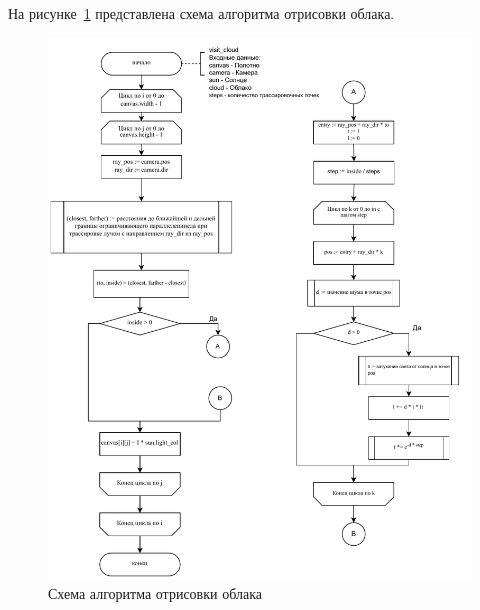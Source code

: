 На рисунке~\ref{fig:cloud_fc} представлена схема алгоритма отрисовки облака.
\begin{figure}[ht!]
	\centering
	\includegraphics[width=1.0\textwidth, page=1]{assets/img/cloud_flowchart.pdf}   
	\caption{Схема алгоритма отрисовки облака}
	\label{fig:cloud_fc}
\end{figure}

